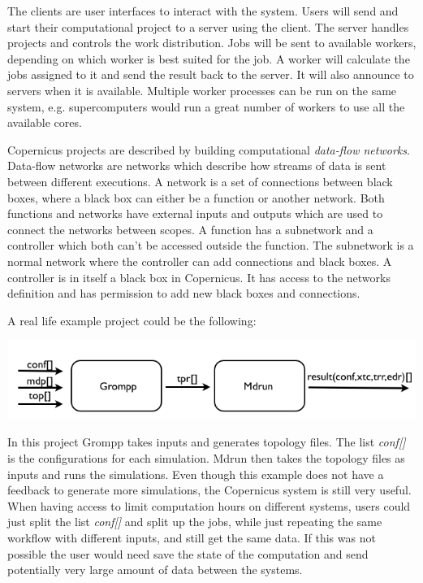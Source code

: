 The clients are user interfaces to interact with the system. Users
will send and start their computational project to a server using the
client. The server handles projects and controls the work
distribution. Jobs will be sent to available workers, depending on
which worker is best suited for the job. A worker will calculate the
jobs assigned to it and send the result back to the server. It will
also announce to servers when it is available. Multiple worker
processes can be run on the same system, e.g. supercomputers would run
a great number of workers to use all the available cores.

Copernicus projects are described by building computational
\emph{data-flow networks}. Data-flow networks are networks which
describe how streams of data is sent between different executions.  A
network is a set of connections between black boxes, where a black box
can either be a function or another network. Both functions and
networks have external inputs and outputs which are used to connect
the networks between scopes. A function has a subnetwork and a
controller which both can't be accessed outside the function. The
subnetwork is a normal network where the controller can add
connections and black boxes. A controller is in itself a black box in
Copernicus. It has access to the networks definition and has
permission to add new black boxes and connections.

%

A real life example project could be the following:

\begin{center}
\includegraphics[scale=0.4]{Chapters/IntroductionIncludes/example.png}
\end{center}

In this project Grompp takes inputs and generates topology files. The
list \emph{conf[]} is the configurations for each simulation. Mdrun
then takes the topology files as inputs and runs the simulations. Even
though this example does not have a feedback to generate more
simulations, the Copernicus system is still very useful. When having
access to limit computation hours on different systems, users could
just split the list \emph{conf[]} and split up the jobs, while just
repeating the same workflow with different inputs, and still get the
same data. If this was not possible the user would need save the state
of the computation and send potentially very large amount of data
between the systems.

